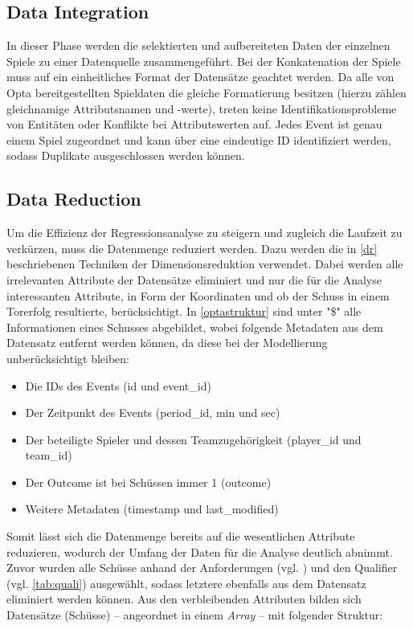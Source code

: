 \subsection{Data Integration}
\label{datai}
In dieser Phase werden die selektierten und aufbereiteten Daten der einzelnen Spiele zu einer Datenquelle zusammengeführt. Bei der Konkatenation der Spiele muss auf ein einheitliches Format der Datensätze geachtet werden. Da alle von Opta bereitgestellten Spieldaten die gleiche Formatierung besitzen (hierzu zählen gleichnamige Attributsnamen und -werte), treten keine Identifikationsprobleme von Entitäten oder Konflikte bei Attributswerten auf. Jedes Event ist genau einem Spiel zugeordnet und kann über eine eindeutige ID identifiziert werden, sodass Duplikate ausgeschlossen werden können.
\newpage

\subsection{Data Reduction}
\label{datar}
Um die Effizienz der Regressionsanalyse zu steigern und zugleich die Laufzeit zu verkürzen, muss die Datenmenge reduziert werden. Dazu werden die in \vref{dr} beschriebenen Techniken der Dimensionsreduktion verwendet. Dabei werden alle irrelevanten Attribute der Datensätze eliminiert und nur die für die Analyse interessanten Attribute, in Form der Koordinaten und ob der Schuss in einem Torerfolg resultierte, berücksichtigt. In \vref{optastruktur} sind unter \textsf{"\$"} alle Informationen eines Schusses abgebildet, wobei folgende Metadaten aus dem Datensatz entfernt werden können, da diese bei der Modellierung unberücksichtigt bleiben:

\begin{itemize}
\item Die IDs des Events (\textsf{id} und \textsf{event\_id})
\item Der Zeitpunkt des Events (\textsf{period\_id}, \textsf{min} und \textsf{sec})
\item Der beteiligte Spieler und dessen Teamzugehörigkeit (\textsf{player\_id} und \textsf{team\_id})
\item Der Outcome ist bei Schüssen immer \textsf{1} (\textsf{outcome})
\item Weitere Metadaten (\textsf{timestamp} und \textsf{last\_modified})
\end{itemize}

Somit lässt sich die Datenmenge bereits auf die wesentlichen Attribute reduzieren, wodurch der Umfang der Daten für die Analyse deutlich abnimmt. Zuvor wurden alle Schüsse anhand der Anforderungen (vgl. ) und den Qualifier (vgl. \vref{tab:quali}) ausgewählt, sodass letztere ebenfalls aus dem Datensatz eliminiert werden können. Aus den verbleibenden Attributen bilden sich Datensätze (Schüsse) -- angeordnet in einem \textit{Array} -- mit folgender Struktur:
\newline\enlargethispage{2\baselineskip} 

